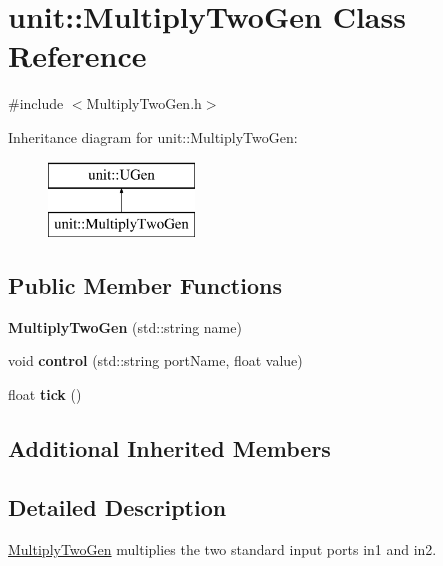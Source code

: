 \hypertarget{classunit_1_1MultiplyTwoGen}{}\section{unit\+:\+:Multiply\+Two\+Gen Class Reference}
\label{classunit_1_1MultiplyTwoGen}


{\ttfamily \#include $<$Multiply\+Two\+Gen.\+h$>$}

Inheritance diagram for unit\+:\+:Multiply\+Two\+Gen\+:\begin{figure}[H]
\begin{center}
\leavevmode
\includegraphics[height=2.000000cm]{classunit_1_1MultiplyTwoGen}
\end{center}
\end{figure}
\subsection*{Public Member Functions}
\begin{DoxyCompactItemize}
\item 
{\bfseries Multiply\+Two\+Gen} (std\+::string name)\hypertarget{classunit_1_1MultiplyTwoGen_a35e526170e8ac7a43fc19c2a78e14b44}{}\label{classunit_1_1MultiplyTwoGen_a35e526170e8ac7a43fc19c2a78e14b44}

\item 
void {\bfseries control} (std\+::string port\+Name, float value)\hypertarget{classunit_1_1MultiplyTwoGen_af8558651a63c73f27221e99ad03f3242}{}\label{classunit_1_1MultiplyTwoGen_af8558651a63c73f27221e99ad03f3242}

\item 
float {\bfseries tick} ()\hypertarget{classunit_1_1MultiplyTwoGen_a70a07ad9e0f67e6a50aadcdf902db8f3}{}\label{classunit_1_1MultiplyTwoGen_a70a07ad9e0f67e6a50aadcdf902db8f3}

\end{DoxyCompactItemize}
\subsection*{Additional Inherited Members}


\subsection{Detailed Description}
\hyperlink{classunit_1_1MultiplyTwoGen}{Multiply\+Two\+Gen} multiplies the two standard input ports in1 and in2.

